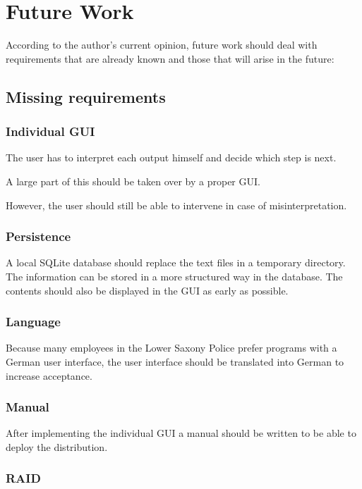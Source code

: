 \chapter{Future Work}
\label{chap:future}

According to the author's current opinion, future work should deal with requirements that are already known and those that will arise in the future:

\section{Missing requirements}
\label{sec:missing}

\subsection{Individual GUI}

The user has to interpret each output himself and decide which step is next.

A large part of this should be taken over by a proper GUI.

However, the user should still be able to intervene in case of misinterpretation.

\subsection{Persistence}

A local SQLite database should replace the text files in a temporary directory. The information can be stored in a more structured way in the database. The contents should also be displayed in the GUI as early as possible.

\subsection{Language}

Because many employees in the Lower Saxony Police prefer programs with a German user interface, the user interface should be translated into German to increase acceptance.

\subsection{Manual}

After implementing the individual GUI a manual should be written to be able to deploy the distribution.

\subsection{RAID}

